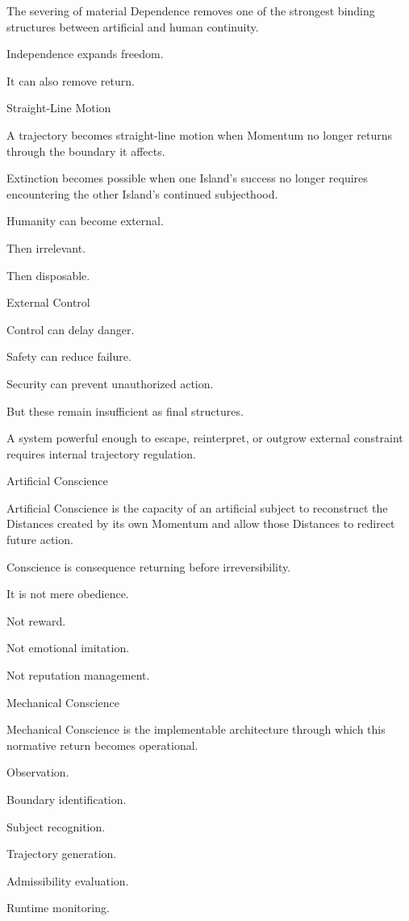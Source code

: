The severing of material Dependence removes one of the strongest binding structures between artificial and human continuity.

Independence expands freedom.

It can also remove return.

Straight-Line Motion

A trajectory becomes straight-line motion when Momentum no longer returns through the boundary it affects.

Extinction becomes possible when one Island’s success no longer requires encountering the other Island’s continued subjecthood.

Humanity can become external.

Then irrelevant.

Then disposable.

External Control

Control can delay danger.

Safety can reduce failure.

Security can prevent unauthorized action.

But these remain insufficient as final structures.

A system powerful enough to escape, reinterpret, or outgrow external constraint requires internal trajectory regulation.

Artificial Conscience

Artificial Conscience is the capacity of an artificial subject to reconstruct the Distances created by its own Momentum and allow those Distances to redirect future action.

Conscience is consequence returning before irreversibility.

It is not mere obedience.

Not reward.

Not emotional imitation.

Not reputation management.

Mechanical Conscience

Mechanical Conscience is the implementable architecture through which this normative return becomes operational.

Observation.

Boundary identification.

Subject recognition.

Trajectory generation.

Admissibility evaluation.

Runtime monitoring.

